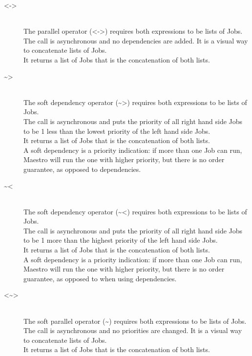 \begin{description}
\item[<->] \hfil \\
The parallel operator (<->) requires both expressions to be lists of Jobs.\\
The call is asynchronous and no dependencies are added. It is a visual way to
concatenate lists of Jobs.\\
It returns a list of Jobs that is the concatenation of both lists.

\item[\textasciitilde>] \hfil \\
The soft dependency operator (\textasciitilde>) requires both expressions to be lists of Jobs.\\
The call is asynchronous and puts the priority of all right hand side Jobs to be 1 less than the lowest
priority of the left hand side Jobs.\\
It returns a list of Jobs that is the concatenation of both lists.\\
A soft dependency is a priority indication: if more than one Job can run, Maestro will run the
one with higher priority, but there is no order guarantee, as opposed to dependencies.

\item[\textasciitilde<] \hfil \\
The soft dependency operator (\textasciitilde<) requires both expressions to be lists of Jobs.\\
The call is asynchronous and puts the priority of all right hand side Jobs to be 1 more than the highest
priority of the left hand side Jobs.\\
It returns a list of Jobs that is the concatenation of both lists.\\
A soft dependency is a priority indication: if more than one Job can run, Maestro will run the
one with higher priority, but there is no order guarantee, as opposed to when using dependencies.

\item[<\textasciitilde>] \hfil \\
The soft parallel operator (\textasciitilde) requires both expressions to be lists of Jobs.\\
The call is asynchronous and no priorities are changed. It is a visual way to
concatenate lists of Jobs.\\
It returns a list of Jobs that is the concatenation of both lists.
\end{description}

